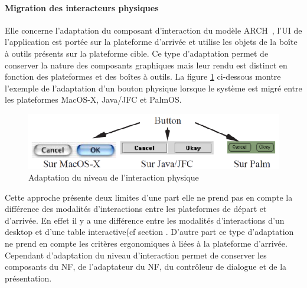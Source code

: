 \paragraph{ Migration des interacteurs physiques}
Elle concerne l'adaptation du composant d'interaction  du modèle ARCH~\cite{Pfaff1985}, l'UI de l'application est portée sur la plateforme d'arrivée et utilise les objets de la boîte à outils présents sur la plateforme cible. Ce type d'adaptation permet de conserver la nature des composants graphiques mais leur rendu est distinct en fonction des plateformes et des  boîtes à outils. La figure \ref{fig:chap3:2} ci-dessous montre l'exemple de l'adaptation  d'un bouton physique lorsque le système est migré entre les plateformes MacOS-X, Java/JFC et PalmOS.

\begin{figure}[ht]
\begin{center}
\label{fig:chap3:2}
\caption{ Adaptation du niveau de l'interaction physique}
\includegraphics[scale=1]{chap3/img-3}
\end{center}
\end{figure}

Cette approche présente deux limites d'une part elle ne prend pas en compte la différence des modalités d'interactions entre les plateformes de départ et d'arrivée. En effet il y a une différence entre les modalités d'interactions d'un desktop et d'une table interactive(cf section %
. D'autre part ce type d'adaptation ne prend en compte les critères ergonomiques à liées à la plateforme d'arrivée. Cependant d'adaptation du niveau d'interaction permet de conserver les composants du NF, de l'adaptateur du NF, du contrôleur de dialogue et de la présentation.

